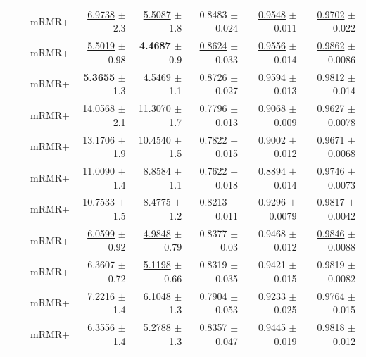 \begin{longtable}{llp{}rrrrr}
 &  & mRMR+ & \underline{6.9738} {\scriptsize $\pm$ 2.3} & \underline{5.5087} {\scriptsize $\pm$ 1.8} & 0.8483 {\scriptsize $\pm$ 0.024} & \underline{0.9548} {\scriptsize $\pm$ 0.011} & \underline{0.9702} {\scriptsize $\pm$ 0.022} \\
 &  & mRMR+ & \underline{5.5019} {\scriptsize $\pm$ 0.98} & \textbf{4.4687} {\scriptsize $\pm$ 0.9} & \underline{0.8624} {\scriptsize $\pm$ 0.033} & \underline{0.9556} {\scriptsize $\pm$ 0.014} & \underline{0.9862} {\scriptsize $\pm$ 0.0086} \\
 &  & mRMR+ & \textbf{5.3655} {\scriptsize $\pm$ 1.3} & \underline{4.5469} {\scriptsize $\pm$ 1.1} & \underline{0.8726} {\scriptsize $\pm$ 0.027} & \underline{0.9594} {\scriptsize $\pm$ 0.013} & \underline{0.9812} {\scriptsize $\pm$ 0.014} \\
 &  & mRMR+ & 14.0568 {\scriptsize $\pm$ 2.1} & 11.3070 {\scriptsize $\pm$ 1.7} & 0.7796 {\scriptsize $\pm$ 0.013} & 0.9068 {\scriptsize $\pm$ 0.009} & 0.9627 {\scriptsize $\pm$ 0.0078} \\
 &  & mRMR+ & 13.1706 {\scriptsize $\pm$ 1.9} & 10.4540 {\scriptsize $\pm$ 1.5} & 0.7822 {\scriptsize $\pm$ 0.015} & 0.9002 {\scriptsize $\pm$ 0.012} & 0.9671 {\scriptsize $\pm$ 0.0068} \\
 &  & mRMR+ & 11.0090 {\scriptsize $\pm$ 1.4} & 8.8584 {\scriptsize $\pm$ 1.1} & 0.7622 {\scriptsize $\pm$ 0.018} & 0.8894 {\scriptsize $\pm$ 0.014} & 0.9746 {\scriptsize $\pm$ 0.0073} \\
 &  & mRMR+ & 10.7533 {\scriptsize $\pm$ 1.5} & 8.4775 {\scriptsize $\pm$ 1.2} & 0.8213 {\scriptsize $\pm$ 0.011} & 0.9296 {\scriptsize $\pm$ 0.0079} & 0.9817 {\scriptsize $\pm$ 0.0042} \\
 &  & mRMR+ & \underline{6.0599} {\scriptsize $\pm$ 0.92} & \underline{4.9848} {\scriptsize $\pm$ 0.79} & 0.8377 {\scriptsize $\pm$ 0.03} & 0.9468 {\scriptsize $\pm$ 0.012} & \underline{0.9846} {\scriptsize $\pm$ 0.0088} \\
 &  & mRMR+ & 6.3607 {\scriptsize $\pm$ 0.72} & \underline{5.1198} {\scriptsize $\pm$ 0.66} & 0.8319 {\scriptsize $\pm$ 0.035} & 0.9421 {\scriptsize $\pm$ 0.015} & 0.9819 {\scriptsize $\pm$ 0.0082} \\
 &  & mRMR+ & 7.2216 {\scriptsize $\pm$ 1.4} & 6.1048 {\scriptsize $\pm$ 1.3} & 0.7904 {\scriptsize $\pm$ 0.053} & 0.9233 {\scriptsize $\pm$ 0.025} & \underline{0.9764} {\scriptsize $\pm$ 0.015} \\
 &  & mRMR+ & \underline{6.3556} {\scriptsize $\pm$ 1.4} & \underline{5.2788} {\scriptsize $\pm$ 1.3} & \underline{0.8357} {\scriptsize $\pm$ 0.047} & \underline{0.9445} {\scriptsize $\pm$ 0.019} & \underline{0.9818} {\scriptsize $\pm$ 0.012} \\

\end{longtable}
